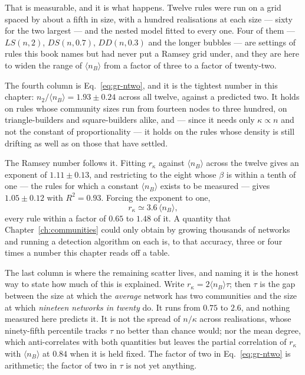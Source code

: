 That is measurable, and it is what happens. Twelve rules were run on a grid
spaced by about a fifth in size, with a hundred realisations at each size --- sixty
for the two largest --- and the nested model fitted to every one. Four of them ---
$LS(n,2)$, $DS(n,0.7)$, $DD(n,0.3)$ and the longer bubbles --- are settings of
rules this book names but had never put a Ramsey grid under, and they are here to
widen the range of $\langle n_B\rangle$ from a factor of three to a factor of
twenty-two.



\noindent The fourth column is Eq.~\eqref{eq:gr-ntwo}, and it is the tightest
number in this chapter: $n_2/\langle n_B\rangle=1.93\pm0.24$ across all twelve,
against a predicted two. It holds on rules whose community sizes run from
fourteen nodes to three hundred, on triangle-builders and square-builders alike,
and --- since it needs only $\kappa\propto n$ and not the constant of
proportionality --- it holds on the rules whose density is still drifting as well
as on those that have settled.

The Ramsey number follows it. Fitting $r_\kappa$ against $\langle n_B\rangle$
across the twelve gives an exponent of $1.11\pm0.13$, and restricting to the
eight whose $\beta$ is within a tenth of one --- the rules for which a constant
$\langle n_B\rangle$ exists to be measured --- gives $1.05\pm0.12$ with
$R^2=0.93$. Forcing the exponent to one,
\begin{equation}
  r_\kappa \simeq 3.6\,\langle n_B\rangle,
  \label{eq:gr-rknb}
\end{equation}
every rule within a factor of $0.65$ to $1.48$ of it. A quantity that
Chapter~\ref{ch:communities} could only obtain by growing thousands of networks
and running a detection algorithm on each is, to that accuracy, three or four
times a number this chapter reads off a table.

The last column is where the remaining scatter lives, and naming it is the honest
way to state how much of this is explained. Write $r_\kappa=2\langle n_B\rangle
\tau$; then $\tau$ is the gap between the size at which the \emph{average}
network has two communities and the size at which \emph{nineteen networks in
twenty} do. It runs from $0.75$ to $2.6$, and nothing measured here predicts it.
It is not the spread of $n/\kappa$ across realisations, whose ninety-fifth
percentile tracks $\tau$ no better than chance would; nor the mean degree, which
anti-correlates with both quantities but leaves the partial correlation of
$r_\kappa$ with $\langle n_B\rangle$ at $0.84$ when it is held fixed. The factor of two in Eq.~\eqref{eq:gr-ntwo} is arithmetic;
the factor of two in $\tau$ is not yet anything.

